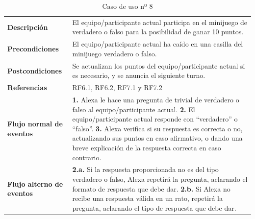 \begin{table}[H]
	\centering
	\begin{tabular}{|p{3cm}|p{12cm}|}
		\hline
		\rowcolor{lightgray}
		\multicolumn{2}{|c|}{\textbf{CU08}: Minijuego verdadero o falso} \\
		\hline
		\textbf{Descripción} & El equipo/participante actual participa en el minijuego de verdadero o falso para la posibilidad de ganar 10 puntos. \vspace{0.2cm} \\
		\hline
		\textbf{Precondiciones} & El equipo/participante actual ha caído en una casilla del minijuego verdadero o falso. \vspace{0.2cm} \\
		\hline
		\textbf{Postcondiciones} & Se actualizan los puntos del equipo/participante actual si es necesario, y se anuncia el siguiente turno. \vspace{0.2cm} \\
		\hline
		\textbf{Referencias} & RF6.1, RF6.2, RF7.1 y RF7.2 \vspace{0.2cm} \\
		\hline
		\textbf{Flujo normal de eventos} &
		\textbf{1.} Alexa le hace una pregunta de trivial de verdadero o falso al equipo/participante actual. \newline
		\vspace{0.2cm}
		\textbf{2.} El equipo/participante actual responde con \enquote{verdadero} o \enquote{falso}. \newline
		\vspace{0.2cm}
		\textbf{3.} Alexa verifica si su respuesta es correcta o no, actualizando sus puntos en caso afirmativo, o dando una breve explicación de la respuesta correcta en caso contrario.
		\vspace{0.2cm} \\
		\hline
		\textbf{Flujo alterno de eventos} &
		\textbf{2.a.} Si la respuesta proporcionada no es del tipo verdadero o falso, Alexa repetirá la pregunta, aclarando el formato de respuesta que debe dar. \newline
		\vspace{0.2cm} 
		\textbf{2.b.} Si Alexa no recibe una respuesta válida en un rato, repetirá la pregunta, aclarando el tipo de respuesta que debe dar. \vspace{0.2cm} \\
		\hline
	\end{tabular}
	\caption{Caso de uso nº 8}
	\label{tab:CU08}
\end{table}

